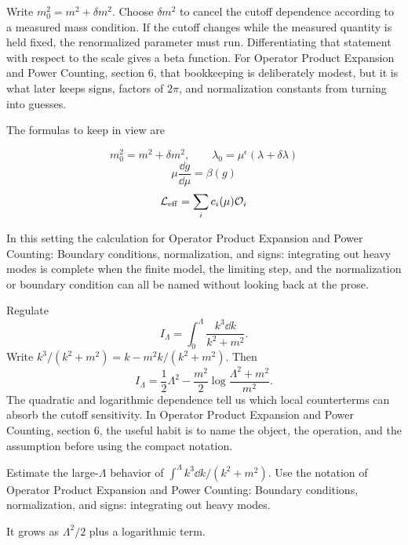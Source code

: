 Write \(m_0^2=m^2+\delta m^2\).  Choose \(\delta m^2\) to cancel the cutoff dependence according to a measured mass condition.  If the cutoff changes while the measured quantity is held fixed, the renormalized parameter must run.  Differentiating that statement with respect to the scale gives a beta function.  For Operator Product Expansion and Power Counting, section 6, that bookkeeping is deliberately modest, but it is what later keeps signs, factors of \(2\pi\), and normalization constants from turning into guesses.

The formulas to keep in view are

\[
  m_0^2=m^2+\delta m^2,\qquad \lambda_0=\mu^\epsilon(\lambda+\delta\lambda)
\]
\[
  \mu\frac{\dd g}{\dd\mu}=\beta(g)
\]
\[
  \mathcal L_{\mathrm{eff}}=\sum_i c_i(\mu)\mathcal O_i
\]

In this setting the calculation for Operator Product Expansion and Power Counting: Boundary conditions, normalization, and signs: integrating out heavy modes is complete when the finite model, the limiting step, and the normalization or boundary condition can all be named without looking back at the prose.




\begin{example}
Regulate
\[
  I_\Lambda=\int_0^\Lambda\frac{k^3\dd k}{k^2+m^2}.
\]
Write \(k^3/(k^2+m^2)=k-m^2k/(k^2+m^2)\).  Then
\[
  I_\Lambda=\frac12\Lambda^2-\frac{m^2}{2}\log\frac{\Lambda^2+m^2}{m^2}.
\]
The quadratic and logarithmic dependence tell us which local counterterms can absorb the cutoff sensitivity.  In Operator Product Expansion and Power Counting, section 6, the useful habit is to name the object, the operation, and the assumption before using the compact notation.
\end{example}



\begin{exercise}
Estimate the large-\(\Lambda\) behavior of \(\int^\Lambda k^3\dd k/(k^2+m^2)\).  Use the notation of Operator Product Expansion and Power Counting: Boundary conditions, normalization, and signs: integrating out heavy modes.
\begin{answer}
It grows as \(\Lambda^2/2\) plus a logarithmic term.
\end{answer}
\end{exercise}


